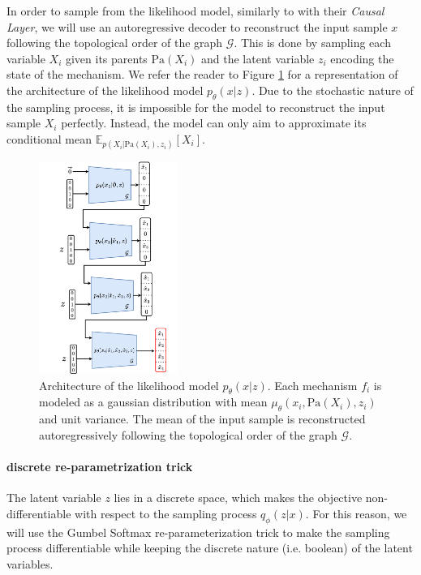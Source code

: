 \documentclass{article}
\begin{document}
In order to sample from the likelihood model, similarly to \citet{CausalVAE}
with their \textit{Causal Layer}, we will use an autoregressive decoder to
reconstruct the input sample $x$ following the topological order of the graph
$\mathcal{G}$. This is done by sampling each variable $X_i$ given its parents
$\text{Pa}(X_i)$ and the latent variable $z_i$ encoding the state of the
mechanism. We refer the reader to Figure \ref{fig:architecture_decoder} for a
representation of the architecture of the likelihood model $p_\theta(x | z)$.
Due to the stochastic nature of the sampling process, it is impossible for the
model to reconstruct the input sample $X_i$ perfectly. Instead, the model can
only aim to approximate its conditional mean
$\mathbb{E}_{p(X_i|\text{Pa}(X_i),z_i)}[X_i]$.
\begin{figure}
    \centering
    \includegraphics[width=0.4\textwidth]{images/architecture_decoder.pdf}
    \caption{Architecture of the likelihood model $p_\theta(x | z)$. Each mechanism $f_i$ is modeled as a gaussian distribution with mean $\mu_\theta(x_i, \text{Pa}(X_i), z_i)$ and unit variance. The mean of the input sample is reconstructed autoregressively following the topological order of the graph $\mathcal{G}$.}
    \label{fig:architecture_decoder}
\end{figure}
\paragraph{discrete re-parametrization trick}
The latent variable $z$ lies in a discrete space, which makes the objective
non-differentiable with respect to the sampling process $q_\phi(z | x)$. For
this reason, we will use the Gumbel Softmax re-parameterization trick
\citep{jang2017categoricalreparameterizationgumbelsoftmax} to make the sampling
process differentiable while keeping the discrete nature (i.e. boolean) of the
latent variables.
\end{document}
